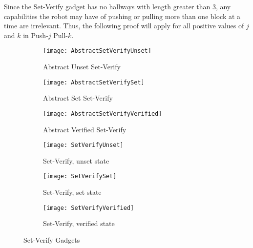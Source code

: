 Since the Set-Verify gadget has no hallways with length greater than 3, any capabilities the robot may have of pushing or pulling more than one block at a time are irrelevant. Thus, the following proof will apply for all positive values of $j$ and $k$ in Push-$j$ Pull-$k$.

%

\begin{figure}[!ht]
  \centering
    \begin{subfigure}[b]{0.3\textwidth}
    \texttt{[image: AbstractSetVerifyUnset]}
    \caption{Abstract Unset Set-Verify}
    \end{subfigure}
    \hfill
    \begin{subfigure}[b]{0.3\textwidth}
    \texttt{[image: AbstractSetVerifySet]}
    \caption{Abstract Set Set-Verify}
    \end{subfigure}
    \hfill
    \begin{subfigure}[b]{0.3\textwidth}
    \texttt{[image: AbstractSetVerifyVerified]}
    \caption{Abstract Verified Set-Verify}
  \end{subfigure}  
   \vspace{10pt}
    \begin{subfigure}[b]{0.3\textwidth}
    \texttt{[image: SetVerifyUnset]}
    \caption{Set-Verify, unset state}
    \label{SetVerifyUnset}
  \end{subfigure}
  \hfill
  \begin{subfigure}[b]{0.3\textwidth}
    \texttt{[image: SetVerifySet]}
    \caption{Set-Verify, set state}
    \label{SetVerifySet}
  \end{subfigure}
  \hfill
  \begin{subfigure}[b]{0.3\textwidth}
    \texttt{[image: SetVerifyVerified]}
    \caption{Set-Verify, verified state}
    \label{SetVerifyVerified}
  \end{subfigure}
  \caption{Set-Verify Gadgets}
  \label{setVerifyDiagrams}
\end{figure}

